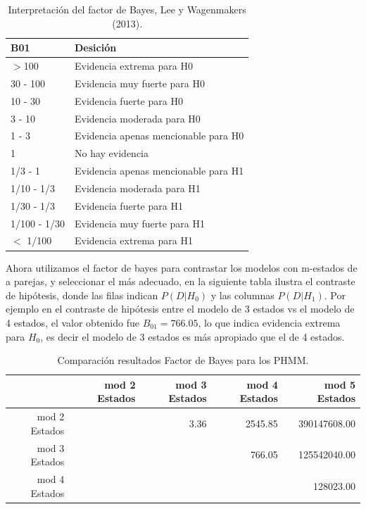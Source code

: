 \documentclass[a4paper]{article}\usepackage[]{graphicx}\usepackage[]{color}
\begin{document}
\begin{table}[ht]
\centering
\begin{tabular}{ll}
  \hline
B01 & Desición \\ 
  \hline
$>$100 & Evidencia extrema para H0 \\ 
  30 - 100 & Evidencia muy fuerte para H0 \\ 
  10 - 30 & Evidencia fuerte para H0 \\ 
  3 - 10 & Evidencia moderada para H0 \\ 
  1 - 3 & Evidencia apenas mencionable para H0 \\ 
  1 & No hay evidencia \\ 
  1/3 - 1 & Evidencia apenas mencionable para H1 \\ 
  1/10 - 1/3 & Evidencia moderada para H1 \\ 
  1/30 - 1/3 & Evidencia fuerte para H1 \\ 
  1/100 - 1/30 & Evidencia muy fuerte para H1 \\ 
  $<$ 1/100 & Evidencia extrema para H1 \\ 
   \hline
\end{tabular}
\caption{Interpretación del factor de Bayes, Lee y Wagenmakers (2013).} 
\end{table}


Ahora utilizamos el factor de bayes para contrastar los modelos con m-estados de a parejas, y seleccionar el más adecuado, en la siguiente tabla ilustra el contraste de hipótesis, donde las filas indican $P(D | H_0)$ y las columnas $P(D | H_1)$. Por ejemplo en el contraste de hipótesis entre el modelo de 3 estados vs el modelo de 4 estados, el valor obtenido fue $B_{01} = 766.05$, lo que indica evidencia extrema para $H_0$, es decir el modelo de 3 estados es más apropiado que el de 4 estados.

\begin{table}[ht]
\centering
\begin{tabular}{rrrrr}
  \hline
 & mod 2 Estados & mod 3 Estados & mod 4 Estados & mod 5 Estados \\ 
  \hline
mod 2 Estados &  & 3.36 & 2545.85 & 390147608.00 \\ 
  mod 3 Estados &  &  & 766.05 & 125542040.00 \\ 
  mod 4 Estados &  &  &  & 128023.00 \\ 
   \hline
\end{tabular}
\caption{Comparación resultados Factor de Bayes para los PHMM.} 
\end{table}
\end{document}
